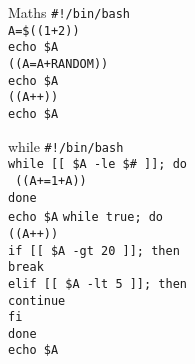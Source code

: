 \documentclass{beamer}
\let\tt\texttt
\begin{document}
\begin{frame}{Maths}
        \tt{\#!/bin/bash}                       \\
        \tt{A=\$((1+2))}                        \\
        \tt{echo \$A}                           \\
        \tt{((A=A+RANDOM))}                     \\
        \tt{echo \$A}                           \\
        \tt{((A++))}                            \\
        \tt{echo \$A}                           \\
\end{frame}

\begin{frame}{while}
        \tt{\#!/bin/bash}                       \\
        \tt{while [[ \$A -le \$\# ]]; do}       \\
        \quad \tt{ ((A+=1+A)) }                 \\
        \tt{done}                               \\
        \tt{echo \$A}
        \tt{while true; do}                     \\
        \quad \tt{((A++))}                      \\
        \quad \tt{if [[ \$A -gt 20 ]]; then}    \\
        \quad \quad \tt{break}                  \\
        \quad \tt{elif [[ \$A -lt 5 ]]; then}   \\
        \quad \quad \tt{continue}               \\
        \quad \tt{fi}                           \\
        \tt{done}                               \\
        \tt{echo \$A}
\end{frame}
\end{document}
